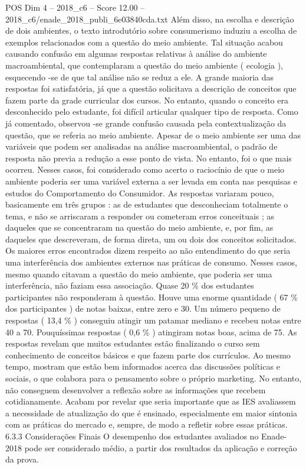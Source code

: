 \begin{textsample}{POS Dim 4 – 2018\_c6 – Score 12.00 – 2018\_c6/enade\_2018\_publi\_6e03840cda.txt}
Além disso, na escolha e descrição de dois ambientes, o texto introdutório sobre consumerismo induziu a escolha de exemplos relacionados com a questão do meio ambiente.
Tal situação acabou causando confusão em algumas respostas relativas à análise do ambiente macroambiental, que contemplaram a questão do meio ambiente ( ecologia ), esquecendo -se de que tal análise não se reduz a ele.
A grande maioria das respostas foi satisfatória, já que a questão solicitava a descrição de conceitos que fazem parte da grade curricular dos cursos.
No entanto, quando o conceito era desconhecido pelo estudante, foi difícil articular qualquer tipo de resposta.
Como já comentado, observou -se grande confusão causada pela contextualização da questão, que se referia ao meio ambiente.
Apesar de o meio ambiente ser uma das variáveis que podem ser analisadas na análise macroambiental, o padrão de resposta não previa a redução a esse ponto de vista.
No entanto, foi o que mais ocorreu.
Nesses casos, foi considerado como acerto o raciocínio de que o meio ambiente poderia ser uma variável externa a ser levada em conta nas pesquisas e estudos do Comportamento do Consumidor.
As respostas variaram pouco, basicamente em três grupos : as de estudantes que desconheciam totalmente o tema, e não se arriscaram a responder ou cometeram erros conceituais ; as daqueles que se concentraram na questão do meio ambiente, e, por fim, as daqueles que descreveram, de forma direta, um ou dois dos conceitos solicitados.
Os maiores erros encontrados dizem respeito ao não entendimento do que seria uma interferência dos ambientes externos nas práticas de consumo.
Nesses casos, mesmo quando citavam a questão do meio ambiente, que poderia ser uma interferência, não faziam essa associação.
Quase 20 \% dos estudantes participantes não responderam à questão.
Houve uma enorme quantidade ( 67 \% dos participantes ) de notas baixas, entre zero e 30.
Um número pequeno de respostas ( 13,4 \% ) conseguiu atingir um patamar mediano e recebeu notas entre 40 a 70.
Pouquíssimas respostas ( 0,6 \% ) atingiram notas boas, acima de 75.
As respostas revelam que muitos estudantes estão finalizando o curso sem conhecimento de conceitos básicos e que fazem parte dos currículos.
Ao mesmo tempo, mostram que estão bem informados acerca das discussões políticas e sociais, o que colabora para o pensamento sobre o próprio marketing.
No entanto, não conseguem desenvolver a reflexão sobre as informações que recebem cotidianamente.
Acabam por revelar que seria importante que as IES avaliassem a necessidade de atualização do que é ensinado, especialmente em maior sintonia com as práticas do mercado e, sempre, de modo a refletir sobre essas práticas. 6.3.3 Considerações Finais O desempenho dos estudantes avaliados no Enade-2018 pode ser considerado médio, a partir dos resultados da aplicação e correção da prova.

\end{textsample}
